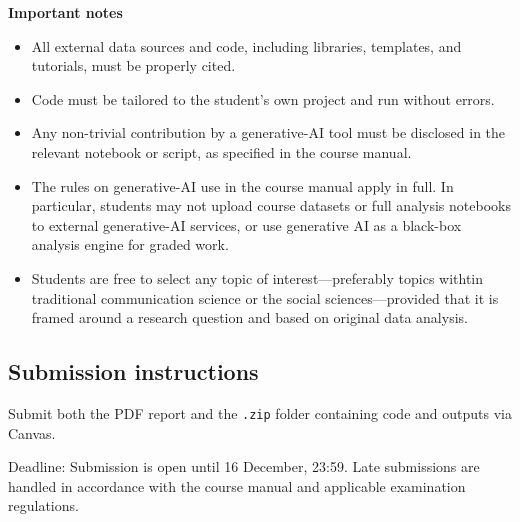 \textbf{Important notes}
\begin{itemize}
    \item All external data sources and code, including libraries, templates, and tutorials, must be properly cited.
    \item Code must be tailored to the student's own project and run without errors.
    \item Any non-trivial contribution by a generative-AI tool must be disclosed in the relevant notebook or script, as specified in the course manual.
    \item The rules on generative-AI use in the course manual apply in full. In particular, students may not upload course datasets or full analysis notebooks to external generative-AI services, or use generative AI as a black-box analysis engine for graded work.
    \item Students are free to select any topic of interest---preferably topics withtin traditional communication science or the social sciences---provided that it is framed around a research question and based on original data analysis.
\end{itemize}

\subsection*{Submission instructions}

Submit both the PDF report and the \texttt{.zip} folder containing code and outputs via Canvas.

Deadline: Submission is open until 16 December, 23:59. Late submissions are handled in accordance with the course manual and applicable examination regulations.
